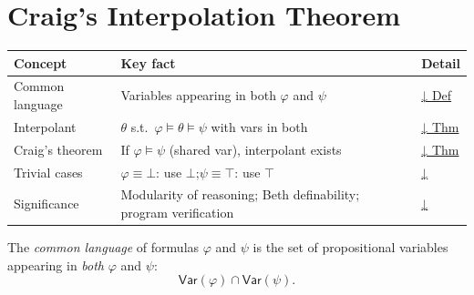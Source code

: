 
\section{Craig's Interpolation Theorem}

\begin{tcolorbox}[colback=gray!6, colframe=gray!40, arc=2pt,
  left=6pt, right=6pt, top=4pt, bottom=4pt,
  title={\small\textbf{Interpolation — Quick Reference}},
  fonttitle=\small\bfseries]
\small
\begin{tabular}{l l l}
\toprule
\textbf{Concept} & \textbf{Key fact} & \textbf{Detail} \\
\midrule
Common language     & Variables appearing in both $\varphi$ and $\psi$ & \hyperref[def:common-lang]{↓ Def} \\
Interpolant         & $\theta$ s.t.\ $\varphi\models\theta\models\psi$ with vars in both & \hyperref[thm:craig]{↓ Thm} \\
Craig's theorem     & If $\varphi\models\psi$ (shared var), interpolant exists & \hyperref[thm:craig]{↓ Thm} \\
Trivial cases       & $\varphi\equiv\bot$: use $\bot$;\quad $\psi\equiv\top$: use $\top$ & \hyperref[rem:trivial]{↓} \\
Significance        & Modularity of reasoning; Beth definability; program verification & \hyperref[rem:significance]{↓} \\
\bottomrule
\end{tabular}
\end{tcolorbox}

\vspace{1em}

\begin{tcolorbox}[colback=propbox, colframe=propborder, arc=2pt,
  left=6pt, right=6pt, top=4pt, bottom=4pt,
  title={\small\textbf{Definition (Common Language)}},
  fonttitle=\small\bfseries]
\label{def:common-lang}
The \emph{common language} of formulas $\varphi$ and $\psi$ is the set of
propositional variables appearing in \emph{both} $\varphi$ and $\psi$:
\[
\mathsf{Var}(\varphi) \cap \mathsf{Var}(\psi).
\]
\end{tcolorbox}

